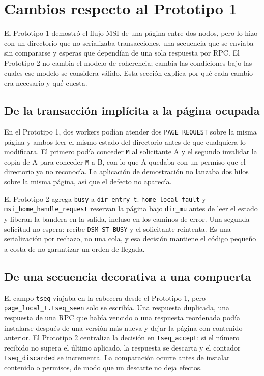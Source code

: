 \documentclass[11pt,spanish]{article}
\begin{document}
\section{Cambios respecto al Prototipo 1}\label{sec:cambios}

El Prototipo 1 demostró el flujo MSI de una página entre dos nodos, pero lo hizo con un directorio que no serializaba transacciones, una secuencia que se enviaba sin compararse y esperas que dependían de una sola respuesta por RPC. El Prototipo 2 no cambia el modelo de coherencia; cambia las condiciones bajo las cuales ese modelo se considera válido. Esta sección explica por qué cada cambio era necesario y qué cuesta.

\subsection{De la transacción implícita a la página ocupada}

En el Prototipo 1, dos workers podían atender dos \texttt{PAGE\_REQUEST} sobre la misma página y ambos leer el mismo estado del directorio antes de que cualquiera lo modificara. El primero podía conceder \texttt{M} al solicitante A y el segundo invalidar la copia de A para conceder \texttt{M} a B, con lo que A quedaba con un permiso que el directorio ya no reconocía. La aplicación de demostración no lanzaba dos hilos sobre la misma página, así que el defecto no aparecía.

El Prototipo 2 agrega \texttt{busy} a \texttt{dir\_entry\_t}. \texttt{home\_local\_fault} y \texttt{msi\_home\_handle\_request} reservan la página bajo \texttt{dir\_mu} antes de leer el estado y liberan la bandera en la salida, incluso en los caminos de error. Una segunda solicitud no espera: recibe \texttt{DSM\_ST\_BUSY} y el solicitante reintenta. Es una serialización por rechazo, no una cola, y esa decisión mantiene el código pequeño a costa de no garantizar un orden de llegada.

\subsection{De una secuencia decorativa a una compuerta}

El campo \texttt{tseq} viajaba en la cabecera desde el Prototipo 1, pero \texttt{page\_local\_t.tseq\_seen} solo se escribía. Una respuesta duplicada, una respuesta de una RPC que había vencido o una respuesta reordenada podía instalarse después de una versión más nueva y dejar la página con contenido anterior. El Prototipo 2 centraliza la decisión en \texttt{tseq\_accept}: si el número recibido no supera el último aplicado, la respuesta se descarta y el contador \texttt{tseq\_discarded} se incrementa. La comparación ocurre antes de instalar contenido o permisos, de modo que un descarte no deja efectos.
\end{document}
